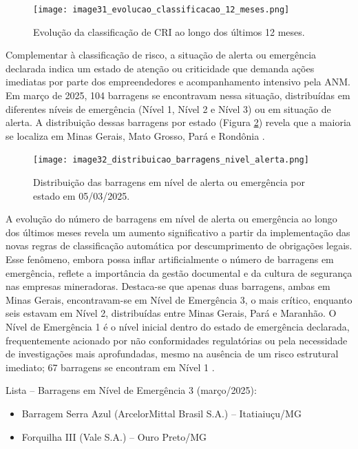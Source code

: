 \begin{figure}[htbp]
    \centering
    \texttt{[image: image31\_evolucao\_classificacao\_12\_meses.png]}
    \caption{Evolução da classificação de CRI ao longo dos últimos 12 meses.}
    \label{fig:evolucao_classificacao}
\end{figure}

Complementar à classificação de risco, a situação de alerta ou emergência declarada indica um estado de atenção ou criticidade que demanda ações imediatas por parte dos empreendedores e acompanhamento intensivo pela ANM. Em março de 2025, 104 barragens se encontravam nessa situação, distribuídas em diferentes níveis de emergência (Nível 1, Nível 2 e Nível 3) ou em situação de alerta. A distribuição dessas barragens por estado (Figura \ref{fig:distribuicao_alerta}) revela que a maioria se localiza em Minas Gerais, Mato Grosso, Pará e Rondônia \cite{anm2025boletim}.

\begin{figure}[htbp]
    \centering
    \texttt{[image: image32\_distribuicao\_barragens\_nivel\_alerta.png]}
    \caption{Distribuição das barragens em nível de alerta ou emergência por estado em 05/03/2025.}
    \label{fig:distribuicao_alerta}
\end{figure}

A evolução do número de barragens em nível de alerta ou emergência ao longo dos últimos meses revela um aumento significativo a partir da implementação das novas regras de classificação automática por descumprimento de obrigações legais. Esse fenômeno, embora possa inflar artificialmente o número de barragens em emergência, reflete a importância da gestão documental e da cultura de segurança nas empresas mineradoras. Destaca-se que apenas duas barragens, ambas em Minas Gerais, encontravam-se em Nível de Emergência 3, o mais crítico, enquanto seis estavam em Nível 2, distribuídas entre Minas Gerais, Pará e Maranhão. O Nível de Emergência 1 é o nível inicial dentro do estado de emergência declarada, frequentemente acionado por não conformidades regulatórias ou pela necessidade de investigações mais aprofundadas, mesmo na ausência de um risco estrutural imediato; 67 barragens se encontram em Nível 1 \cite{anm2025boletim}.

Lista – Barragens em Nível de Emergência 3 (março/2025):
\begin{itemize}
    \item Barragem Serra Azul (ArcelorMittal Brasil S.A.) – Itatiaiuçu/MG
    \item Forquilha III (Vale S.A.) – Ouro Preto/MG
\end{itemize}

